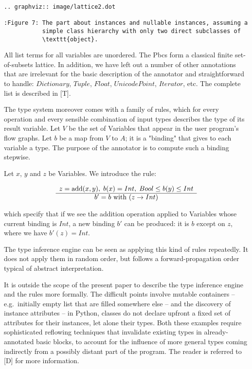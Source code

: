 \documentclass{acm_proc_article-sp}
\begin{document}
\begin{verbatim}
.. graphviz:: image/lattice2.dot

:Figure 7: The part about instances and nullable instances, assuming a
           simple class hierarchy with only two direct subclasses of
           \texttt{object}.
\end{verbatim}


All list terms for all variables are unordered.  The Pbcs form a
classical finite set-of-subsets lattice.  In addition, we have left
out a number of other annotations that are irrelevant for the basic
description of the annotator and straightforward to handle:
$Dictionary$, $Tuple$, $Float$, $UnicodePoint$, $Iterator$, etc.  The
complete list is described in [T].

The type system moreover comes with a family of rules, which for every
operation and every sensible combination of input types describes the
type of its result variable.  Let $V$ be the set of Variables that
appear in the user program's flow graphs.  Let $b$ be a map from $V$
to $A$; it is a "binding" that gives to each variable a type.  The
purpose of the annotator is to compute such a binding stepwise.

Let $x$, $y$ and $z$ be Variables.  We introduce the rule:

$$
\begin{array}{c}
 z = \mathrm{add}(x, y), \; b(x) =
    Int, \; Bool \leq b(y) \leq Int \\ \hline
 b' = b \hbox{\ with\ } (z
    \rightarrow Int) 
\end{array}
$$

which specify that if we see the addition operation applied to
Variables whose current binding is $Int$, a new binding $b'$ can be
produced: it is $b$ except on $z$, where we have $b'(z) = Int$.

The type inference engine can be seen as applying this kind of rules
repeatedly.  It does not apply them in random order, but follows a
forward-propagation order typical of abstract interpretation.

It is outside the scope of the present paper to describe the type
inference engine and the rules more formally.  The difficult points
involve mutable containers -- e.g.\ initially empty list that are filled
somewhere else -- and the discovery of instance attributes -- in Python,
classes do not declare upfront a fixed set of attributes for their
instances, let alone their types.  Both these examples require
sophisticated reflowing techniques that invalidate existing types in
already-annotated basic blocks, to account for the influence of more
general types coming indirectly from a possibly distant part of the
program.  The reader is referred to [D] for more information.
\end{document}
